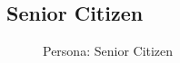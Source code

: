 \documentclass[a4paper,12pt]{report}
\begin{document}
\subsection{Senior Citizen}
\begin{figure}[!htb]
	\caption{\label{fig:senior_citizen}Persona: Senior Citizen}	
\end{figure}

\FloatBarrier
\end{document}
